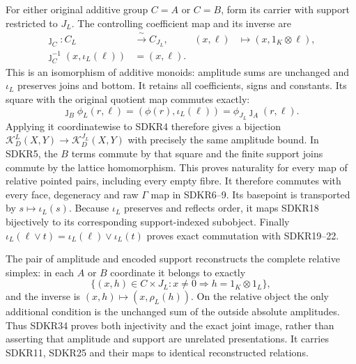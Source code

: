 For either original additive group $C=A$ or $C=B$,
form its carrier with support restricted to $J_L$.
The controlling coefficient map and its inverse are
\begin{equation}\tag{SDKR33}
\begin{aligned}
\jmath_C:C_L&\xrightarrow{\ \sim\ }C_{J_L},
 &(x,\ell)&\longmapsto(x,1_K\otimes\ell),\\
\jmath_C^{-1}(x,\iota_L(\ell))&=(x,\ell).
\end{aligned}
\end{equation}
This is an isomorphism of additive monoids: amplitude
sums are unchanged and $\iota_L$ preserves joins and
bottom. It retains all coefficients, signs and constants.
Its square with the original quotient map commutes
exactly:
\[
\jmath_B\phi_L(r,\ell)
 =(\phi(r),\iota_L(\ell))
 =\phi_{J_L}\jmath_A(r,\ell).
\]
Applying it coordinatewise to SDKR4 therefore gives
a bijection
$\mathcal K_D^L(X,Y)\to\mathcal K_D^{J_L}(X,Y)$
with precisely the same amplitude bound. In SDKR5,
the $B$ terms commute by that square and the finite
support joins commute by the lattice homomorphism.
This proves naturality for every map of relative
pointed pairs, including every empty fibre. It
therefore commutes with every face, degeneracy
and raw $\Gamma$ map in SDKR6--9. Its basepoint
is transported by $s\mapsto\iota_L(s)$.
Because $\iota_L$ preserves and reflects order,
it maps SDKR18 bijectively to its corresponding
support-indexed subobject. Finally
$\iota_L(\ell\vee t)=\iota_L(\ell)\vee\iota_L(t)$
proves exact commutation with SDKR19--22.

The pair of amplitude and encoded support reconstructs
the complete relative simplex: in each $A$ or $B$
coordinate it belongs to exactly
\begin{equation}\tag{SDKR34}
\{(x,h)\in C\times J_L:
                    x\ne0\Rightarrow h=1_K\otimes1_L\},
\end{equation}
and the inverse is $(x,h)\mapsto(x,\rho_L(h))$.
On the relative object the only additional condition
is the unchanged sum of the outside absolute amplitudes.
Thus SDKR34 proves both injectivity and the exact joint
image, rather than asserting that amplitude and support
are unrelated presentations. It carries SDKR11, SDKR25
and their maps to identical reconstructed relations.

